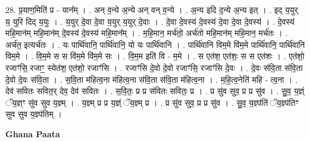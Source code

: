\documentclass[17pt]{extarticle}
\begin{document}
28. प्र॒याण॒मिति॑ प्र - यान᳚म् । . अन् व॒न्ये अ॒न्ये अन् वन् व॒न्ये । . अ॒न्य इदि द॒न्ये अ॒न्य इत् । . इद् य॒युर् य॒ युरि दिद् य॒युः । . य॒युर् दे॒वा दे॒वा य॒युर् य॒युर् दे॒वाः । . दे॒वा दे॒वस्य॑ दे॒वस्य॑ दे॒वा दे॒वा दे॒वस्य॑ । . दे॒वस्य॑ महि॒मान॑म् महि॒मान॑म् दे॒वस्य॑ दे॒वस्य॑ महि॒मान᳚म् । . म॒हि॒मान॒ मर्च॑तो॒ अर्च॑तो महि॒मान॑म् महि॒मान॒ मर्च॑तः । . अर्च॑त॒ इत्यर्च॑तः । . यः पार्थि॑वानि॒ पार्थि॑वानि॒ यो यः पार्थि॑वानि । . पार्थि॑वानि विम॒मे वि॑म॒मे पार्थि॑वानि॒ पार्थि॑वानि विम॒मे । . वि॒म॒मे स स वि॑म॒मे वि॑म॒मे सः । . वि॒म॒म इति॑ वि - म॒मे । . स एत॑श॒ एत॑शः॒ स स एत॑शः । . एत॑शो॒ रजाꣳ॑सि॒ रजाꣳ॒॒ स्येत॑श॒ एत॑शो॒ रजाꣳ॑सि । . रजाꣳ॑सि दे॒वो दे॒वो रजाꣳ॑सि॒ रजाꣳ॑सि दे॒वः । . दे॒वः स॑वि॒ता स॑वि॒ता दे॒वो दे॒वः स॑वि॒ता । . स॒वि॒ता म॑हित्व॒ना म॑हित्व॒ना स॑वि॒ता स॑वि॒ता म॑हित्व॒ना । . म॒हि॒त्व॒नेति॑ महि - त्व॒ना । . देव॑ सवितः सवित॒र् देव॒ देव॑ सवितः । . स॒वि॒तः॒ प्र प्र स॑वितः सवितः॒ प्र । . प्र सु॑व सुव॒ प्र प्र सु॑व । . सु॒व॒ य॒ज्ञ्ं ॅय॒ज्ञ्ꣳ सु॑व सुव य॒ज्ञ्म् । . य॒ज्ञ्म् प्र प्र य॒ज्ञ्ं ॅय॒ज्ञ्म् प्र । . प्र सु॑व सुव॒ प्र प्र सु॑व । . सु॒व॒ य॒ज्ञ्प॑तिं ॅय॒ज्ञ्प॑तिꣳ सुव सुव य॒ज्ञ्प॑तिम् । \newline

\textbf{Ghana Paata } \newline
\end{document}
